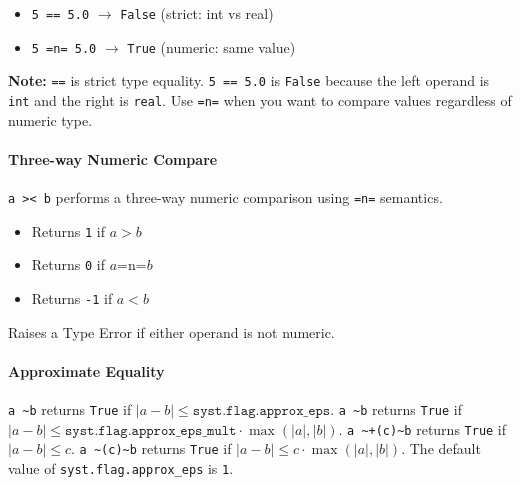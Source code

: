 \documentclass{report}
\begin{document}
\begin{itemize}
\item \texttt{5 == 5.0} $\rightarrow$ \texttt{False} (strict: int vs real)
\item \texttt{5 =n= 5.0} $\rightarrow$ \texttt{True} (numeric: same value)
\end{itemize}

\textbf{Note:} \texttt{==} is strict type equality. \texttt{5 == 5.0} is \texttt{False} because the left operand is \texttt{int} and the right is \texttt{real}. Use \texttt{=n=} when you want to compare values regardless of numeric type.

\paragraph{Three-way Numeric Compare}
\texttt{a >< b} performs a three-way numeric comparison using \texttt{=n=} semantics.
\begin{itemize}
\item Returns \texttt{1} if $a > b$
\item Returns \texttt{0} if $a \mathbin{\texttt{=n=}} b$
\item Returns \texttt{-1} if $a < b$
\end{itemize}
Raises a Type Error if either operand is not numeric.

\paragraph{Approximate Equality}
\texttt{a \textasciitilde b} returns \texttt{True} if $|a - b| \leq \texttt{syst.flag.approx\_eps}$.
\texttt{a \textasciitilde* b} returns \texttt{True} if $|a - b| \leq \texttt{syst.flag.approx\_eps\_mult} \cdot \max(|a|, |b|)$.
\texttt{a \textasciitilde+(c)\textasciitilde b} returns \texttt{True} if $|a - b| \leq c$.
\texttt{a \textasciitilde*(c)\textasciitilde b} returns \texttt{True} if $|a - b| \leq c \cdot \max(|a|, |b|)$.
The default value of \texttt{syst.flag.approx\_eps} is \texttt{1}.
\end{document}
